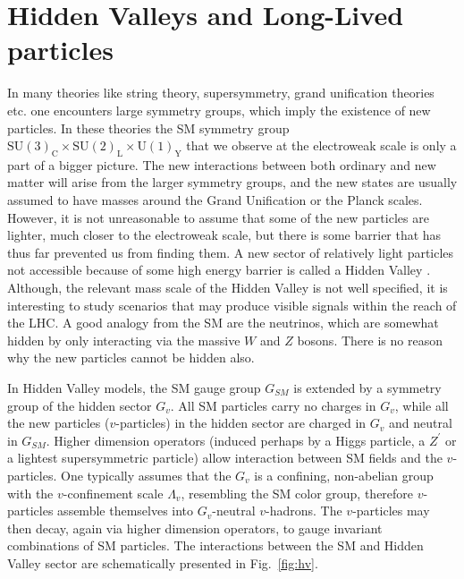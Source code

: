 \section{Hidden Valleys and Long-Lived particles}

In many theories like string theory, supersymmetry, grand unification theories etc.
 one encounters large symmetry groups, which imply the existence of
new particles. In these theories the SM symmetry group $\text{SU}(3)_\text{C} \times \text{SU}(2)_\text{L} \times \text{U}(1)_\text{Y}$ 
 that we observe at the electroweak scale is only a part of a bigger picture.
The new interactions between
both ordinary and new matter will arise from the larger symmetry groups,  and  
the new states are usually
assumed to have masses around the Grand Unification or the Planck scales. However, it is not unreasonable
to assume that some of the new particles are lighter, much closer to the electroweak scale,
but there is some barrier that has thus far prevented us from finding them. A new sector
of relatively light particles not accessible because of some high energy barrier is called 
a Hidden Valley \cite{Strassler:2006im,Strassler:2006qa}.
Although, the relevant mass scale of the Hidden Valley is not well
specified, it is interesting to study scenarios that may produce visible signals within 
the reach of the LHC.
A good analogy from the SM are 
the neutrinos, which are somewhat hidden by only interacting via the massive $W$ and $Z$ bosons.
There is no reason why the new particles cannot be hidden also. 

In Hidden Valley models, the SM gauge group $G_{SM}$ is extended by a symmetry 
group of the hidden sector $G_v$. 
All SM particles carry no charges in $G_v$, while
all the new particles ($v$-particles) in the hidden sector are charged in $G_v$ and neutral 
in $G_{SM}$. Higher dimension operators (induced perhaps by a Higgs particle, a $Z^{'}$ or
a lightest supersymmetric particle) allow interaction between SM
fields and the $v$-particles.
One typically assumes that the $G_v$ is a confining, non-abelian group with the
$v$-confinement scale $\Lambda_v$, resembling the SM color group,
therefore $v$-particles assemble themselves into $G_v$-neutral $v$-hadrons.
The $v$-particles may then decay, again via higher dimension operators, to gauge invariant 
combinations of SM particles. The interactions between the SM and Hidden Valley sector are
schematically presented in Fig.~\ref{fig:hv}. 

